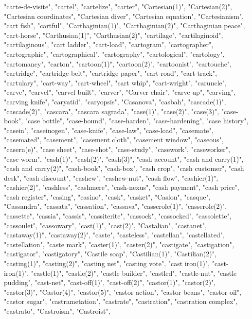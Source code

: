 "carte-de-visite",
"cartel",
"cartelize",
"carter",
"Cartesian(1)",
"Cartesian(2)",
"Cartesian coordinates",
"Cartesian diver",
"Cartesian equation",
"Cartesianism",
"cart fish",
"cartful",
"Carthaginian(1)",
"Carthaginian(2)",
"Carthaginian peace",
"cart-horse",
"Carthusian(1)",
"Carthusian(2)",
"cartilage",
"cartilaginoid",
"cartilaginous",
"cart ladder",
"cart-load",
"cartogram",
"cartographer",
"cartographic",
"cartographical",
"cartography",
"cartological",
"cartology",
"cartomancy",
"carton",
"cartoon(1)",
"cartoon(2)",
"cartoonist",
"cartouche",
"cartridge",
"cartridge-belt",
"cartridge paper",
"cart-road",
"cart-track",
"cartulary",
"cart-way",
"cart-wheel",
"cart whip",
"cart-wright",
"caruncle",
"carve",
"carvel",
"carvel-built",
"carver",
"Carver chair",
"carve-up",
"carving",
"carving knife",
"caryatid",
"caryopsis",
"Casanova",
"casbah",
"cascade(1)",
"cascade(2)",
"cascara",
"cascara sagrada",
"case(1)",
"case(2)",
"case(3)",
"case-book",
"case bottle",
"case-bound",
"case-harden",
"case-hardening",
"case history",
"casein",
"caseinogen",
"case-knife",
"case-law",
"case-load",
"casemate",
"casemated",
"casement",
"casement cloth",
"casement window",
"caseous",
"casern(e)",
"case sheet",
"case-shot",
"case-study",
"casework",
"caseworker",
"case-worm",
"cash(1)",
"cash(2)",
"cash(3)",
"cash-account",
"cash and carry(1)",
"cash and carry(2)",
"cash-book",
"cash-box",
"cash crop",
"cash customer",
"cash desk",
"cash discount",
"cashew",
"cashew-nut",
"cash flow",
"cashier(1)",
"cashier(2)",
"cashless",
"cashmere",
"cash-nexus",
"cash payment",
"cash price",
"cash register",
"casing",
"casino",
"cask",
"casket",
"Caslon",
"casque",
"Cassandra",
"cassata",
"cassation",
"cassava",
"casserole(1)",
"casserole(2)",
"cassette",
"cassia",
"cassis",
"cassiterite",
"cassock",
"cassocked",
"cassolette",
"cassoulet",
"cassowary",
"cast(1)",
"cast(2)",
"Castalian",
"castanet",
"castaway(1)",
"castaway(2)",
"caste",
"casteless",
"castellan",
"castellated",
"castellation",
"caste mark",
"caster(1)",
"caster(2)",
"castigate",
"castigation",
"castigator",
"castigatory",
"Castile soap",
"Castilian(1)",
"Castilian(2)",
"casting(1)",
"casting(2)",
"casting net",
"casting vote",
"cast iron(1)",
"cast-iron(1)",
"castle(1)",
"castle(2)",
"castle builder",
"castled",
"castle-nut",
"castle pudding",
"cast-net",
"cast-off(1)",
"cast-off(2)",
"castor(1)",
"castor(2)",
"castor(3)",
"Castor(4)",
"castor(5)",
"castor action",
"castor beans",
"castor oil",
"castor sugar",
"castrametation",
"castrate",
"castration",
"castration complex",
"castrato",
"Castroism",
"Castroist",

